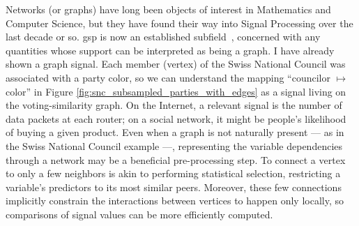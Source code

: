 Networks (or graphs) have long been objects of interest in Mathematics and Computer Science, but they have found their way into Signal Processing over the last decade or so. \acrfull{gsp} is now an established subfield~\cite{shuman2013, sandryhaila2013a, ortega2018}, concerned with any quantities whose support can be interpreted as being a graph. I have already shown a graph signal. Each member (vertex) of the Swiss National Council was associated with a party color, so we can understand the mapping ``councilor $\mapsto$ color'' in Figure \ref{fig:snc_subsampled_parties_with_edges} as a signal living on the voting-similarity graph. On the Internet, a relevant signal is the number of data packets at each router; on a social network, it might be people's likelihood of buying a given product. Even when a graph is not naturally present --- as in the Swiss National Council example ---, representing the variable dependencies through a network may be a beneficial pre-processing step. To connect a vertex to only a few neighbors is akin to performing statistical selection, restricting a variable's predictors to its most similar peers. Moreover, these few connections implicitly constrain the interactions between vertices to happen only locally, so comparisons of signal values can be more efficiently computed.

